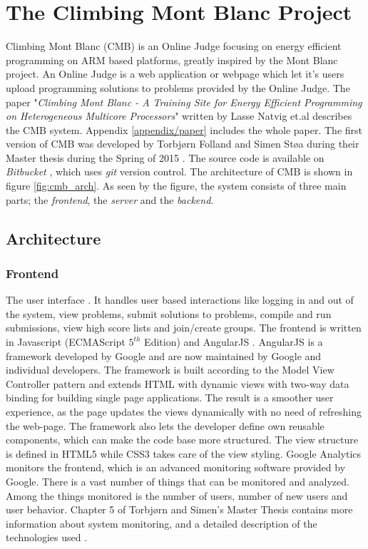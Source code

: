 \section{The Climbing Mont Blanc Project}
Climbing Mont Blanc (CMB) is an Online Judge focusing on energy efficient programming on ARM based platforms, greatly inspired by the Mont Blanc project. An Online Judge is a web application or webpage which let it's users upload programming solutions to problems provided by the Online Judge. The paper "\textit{Climbing Mont Blanc - A Training Site for Energy Efficient Programming on Heterogeneous Multicore Processors}" written by Lasse Natvig et.al \cite{a:CMB} describes the CMB system. Appendix \ref{appendix/paper} includes the whole paper. The first version of CMB was developed by Torbjørn Folland and Simen Støa during their Master thesis during the Spring of 2015 \cite{mt:T&S}. The source code is available on \textit{Bitbucket} \cite{m:bitbucket}, which uses \textit{git} \cite{m:git} version control. The architecture of CMB is shown in figure \ref{fig:cmb_arch}. As seen by the figure, the system consists of three main parts; the \textit{frontend}, the \textit{server} and the \textit{backend}.

\subsection{Architecture}
\subsubsection{Frontend} The user interface . It handles user based interactions like logging in and out of the system, view problems, submit solutions to problems, compile and run submissions, view high score lists and join/create groups. The frontend is written in Javascript (ECMAScript $5^{th}$ Edition) and AngularJS \cite{m:angular}. AngularJS is a framework developed by Google and are now maintained by Google and individual developers. The framework is built according to the Model View Controller pattern and extends HTML with dynamic views with two-way data binding for building single page applications. The result is a smoother user experience, as the page updates the views dynamically with no need of refreshing the web-page. The framework also lets the developer define own reusable components, which can make the code base more structured. The view structure is defined in HTML5 while CSS3 takes care of the view styling. Google Analytics monitors the frontend, which is an advanced monitoring software provided by Google. There is a vast number of things that can be monitored and analyzed. Among the things monitored is the number of users, number of new users and user behavior. Chapter 5 of Torbjørn and Simen's Master Thesis  contains more information about system monitoring, and a detailed description of the technologies used \cite{mt:T&S}. \\

